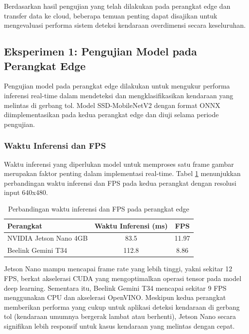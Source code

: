 Berdasarkan hasil pengujian yang telah dilakukan pada perangkat edge dan transfer data ke cloud, beberapa temuan penting dapat disajikan untuk mengevaluasi performa sistem deteksi kendaraan overdimensi secara keseluruhan.

\subsection{Eksperimen 1: Pengujian Model pada Perangkat Edge}
\label{sec:eksperimen1}

Pengujian model pada perangkat edge dilakukan untuk mengukur performa inferensi real-time dalam mendeteksi dan mengklasifikasikan kendaraan yang melintas di gerbang tol. Model SSD-MobileNetV2 dengan format ONNX diimplementasikan pada kedua perangkat edge dan diuji selama periode pengujian.

\subsubsection{Waktu Inferensi dan FPS}

Waktu inferensi yang diperlukan model untuk memproses satu frame gambar merupakan faktor penting dalam implementasi real-time. Tabel \ref{tab:inference_time} menunjukkan perbandingan waktu inferensi dan FPS pada kedua perangkat dengan resolusi input 640x480.

\begin{table}[htbp]
  \centering
  \begin{tabular}{|l|c|c|}
  \hline
  \rowcolor[HTML]{C0C0C0}
  \textbf{Perangkat} & \textbf{Waktu Inferensi (ms)} & \textbf{FPS} \\
  \hline
  NVIDIA Jetson Nano 4GB & 83.5 & 11.97 \\
  \hline
  Beelink Gemini T34 & 112.8 & 8.86 \\
  \hline
  \end{tabular}
  \caption{Perbandingan waktu inferensi dan FPS pada perangkat edge}
  \label{tab:inference_time}
\end{table}

Jetson Nano mampu mencapai frame rate yang lebih tinggi, yakni sekitar 12 FPS, berkat akselerasi CUDA yang mengoptimalkan operasi tensor pada model deep learning. Sementara itu, Beelink Gemini T34 mencapai sekitar 9 FPS menggunakan CPU dan akselerasi OpenVINO. Meskipun kedua perangkat memberikan performa yang cukup untuk aplikasi deteksi kendaraan di gerbang tol (kendaraan umumnya bergerak lambat atau berhenti), Jetson Nano secara signifikan lebih responsif untuk kasus kendaraan yang melintas dengan cepat.


